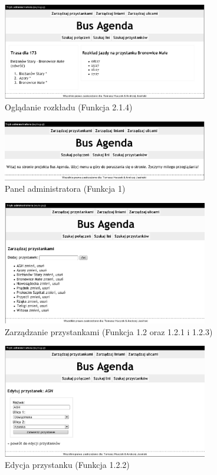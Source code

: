 \begin{figure}[!htp]
    \centering
    \includegraphics[width=0.8\textwidth]{./img/screens/showTT.eps}
    \caption{Oglądanie rozkładu (Funkcja 2.1.4)}
    \label{fig:showTT}
\end{figure}

\begin{figure}[!htp]
    \centering
    \includegraphics[width=0.8\textwidth]{./img/screens/adminMain.eps}
    \caption{Panel administratora (Funkcja 1)}
    \label{fig:adminMain}
\end{figure}
%
\begin{figure}[!htp]
    \centering
    \includegraphics[width=0.8\textwidth]{./img/screens/manageBS_main.eps}
    \caption{Zarządzanie przystankami (Funkcja 1.2 oraz 1.2.1 i 1.2.3)}
    \label{fig:adminMain}
\end{figure}
\begin{figure}[!htp]
    \centering
    \includegraphics[width=0.8\textwidth]{./img/screens/manageBS.eps}
    \caption{Edycja przystanku (Funkcja 1.2.2)}
    \label{fig:bsMgt}
\end{figure}
